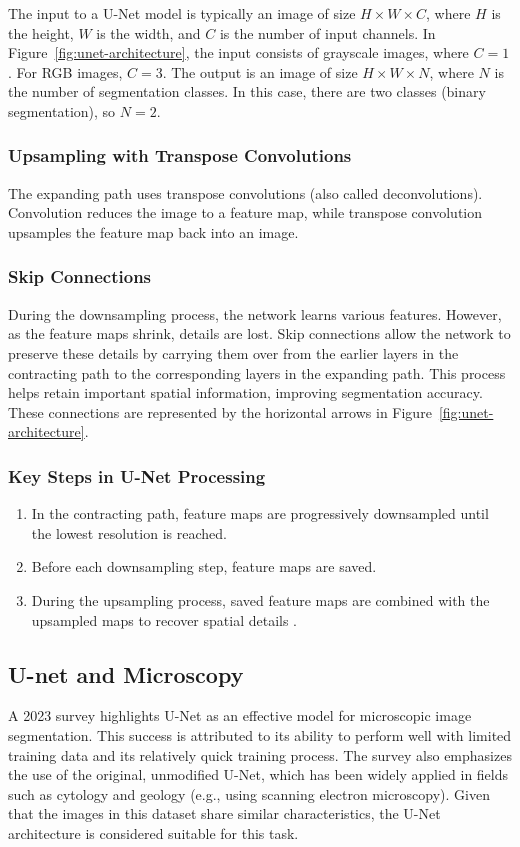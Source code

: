 The input to a U-Net model is typically an image of size $H \times W \times C$, where $H$ is the height, $W$ is the width, and $C$ is the number of input channels. In Figure~\ref{fig:unet-architecture}, the input consists of grayscale images, where $C = 1$. For RGB images, $C = 3$. The output is an image of size $H \times W \times N$, where $N$ is the number of segmentation classes. In this case, there are two classes (binary segmentation), so $N = 2$.

\subsubsection{Upsampling with Transpose Convolutions}

The expanding path uses transpose convolutions (also called deconvolutions). Convolution reduces the image to a feature map, while transpose convolution upsamples the feature map back into an image.

\subsubsection{Skip Connections}

During the downsampling process, the network learns various features. However, as the feature maps shrink, details are lost. Skip connections allow the network to preserve these details by carrying them over from the earlier layers in the contracting path to the corresponding layers in the expanding path. This process helps retain important spatial information, improving segmentation accuracy. These connections are represented by the horizontal arrows in Figure~\ref{fig:unet-architecture}.
\subsubsection{Key Steps in U-Net Processing}
\begin{enumerate}
    \item In the contracting path, feature maps are progressively downsampled until the lowest resolution is reached.
    \item Before each downsampling step, feature maps are saved.
    \item During the upsampling process, saved feature maps are combined with the upsampled maps to recover spatial details \cite{ronneberger_u-net_2015}.
\end{enumerate}

\subsection{U-net and Microscopy}
A 2023 survey \cite{wu_state---art_2024} highlights U-Net as an effective model for microscopic image segmentation. This success is attributed to its ability to perform well with limited training data and its relatively quick training process. The survey also emphasizes the use of the original, unmodified U-Net, which has been widely applied in fields such as cytology and geology \cite{chen_deep_2020} (e.g., using scanning electron microscopy). Given that the images in this dataset share similar characteristics, the U-Net architecture is considered suitable for this task.

